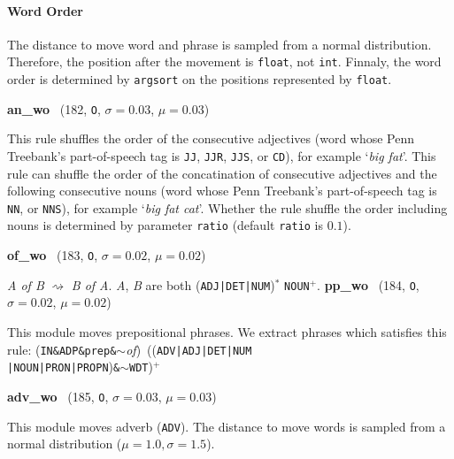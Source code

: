 \documentclass[11pt]{article}
\newenvironment{desc}{%
	\list{}{%
		\parsep 0.25em
		\topsep 0.25em
		\leftmargin 1em
		\rightmargin 0em
	}
	\item\relax
	\sloppy
}{%
	\endlist
}
\newcommand{\attr}[4]{%
	(#1, \texttt{#2}, $\sigma=#3$, $\mu=#4$)
}
\begin{document}
\paragraph{Word Order}\mbox{}

The distance to move word and phrase is sampled from a normal distribution.
Therefore, the position after the movement is \texttt{float}, not \texttt{int}.
Finnaly, the word order is determined by \texttt{argsort} on the positions represented by \texttt{float}.

\noindent
\textbf{an\_wo}~\attr{182}{O}{0.03}{0.03}

\begin{desc}
	This rule shuffles the order of the consecutive adjectives
	(word whose Penn Treebank's part-of-speech tag is \texttt{JJ}, \texttt{JJR}, \texttt{JJS}, or \texttt{CD}),
	for example `\textit{big fat}'.
	This rule can shuffle the order of the concatination of consecutive adjectives and the following consecutive nouns
	(word whose Penn Treebank's part-of-speech tag is \texttt{NN}, or \texttt{NNS}),
	for example `\textit{big fat cat}'.
	Whether the rule shuffle the order including nouns is determined by parameter \texttt{ratio} (default \texttt{ratio} is $0.1$).
\end{desc}

\noindent
\textbf{of\_wo}~\attr{183}{O}{0.02}{0.02}

\begin{desc}
	\textit{A of B}
	$\rightsquigarrow$
	\textit{B of A}.
	\textit{A}, \textit{B} are both
	(\texttt{ADJ}\texttt{|}\texttt{DET}\texttt{|}\texttt{NUM})${}^*$ \texttt{NOUN}${}^+$.
\end{desc}
%
\noindent
\textbf{pp\_wo}~\attr{184}{O}{0.02}{0.02}

\begin{desc}
	This module moves prepositional phrases.
	We extract phrases which satisfies this rule:
	(\texttt{IN}\texttt{\&}\texttt{ADP}\texttt{\&}\texttt{prep}\texttt{\&}$\sim$\textit{of})~((\texttt{ADV}\texttt{|}\texttt{ADJ}\texttt{|}\texttt{DET}\texttt{|}\texttt{NUM}\\\texttt{|}\texttt{NOUN}\texttt{|}\texttt{PRON}\texttt{|}\texttt{PROPN})\texttt{\&}$\sim$\texttt{WDT})${}^+$
\end{desc}

\noindent
\textbf{adv\_wo}~\attr{185}{O}{0.03}{0.03}

\begin{desc}
	This module moves adverb (\texttt{ADV}).
	The distance to move words is sampled from a normal distribution ($\mu=1.0, \sigma=1.5$).
\end{desc}
\end{document}
